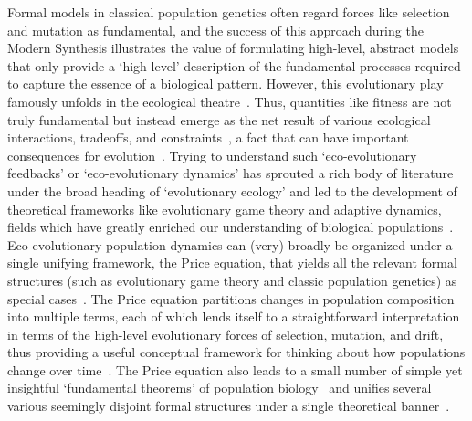 Formal models in classical population genetics often regard forces like selection and mutation as fundamental, and the success of this approach during the Modern Synthesis illustrates the value of formulating high-level, abstract models that only provide a `high-level' description of the fundamental processes required to capture the essence of a biological pattern. However, this evolutionary play famously unfolds in the ecological theatre~\citep{hutchinson_ecological_1965}. Thus, quantities like fitness are not truly fundamental but instead emerge as the net result of various ecological interactions, tradeoffs, and constraints~\citep{metz_how_1992}, a fact that can have important consequences for evolution~\citep{coulson_putting_2006, kokko_can_2017}. Trying to understand such `eco-evolutionary feedbacks' or `eco-evolutionary dynamics' has sprouted a rich body of literature under the broad heading of `evolutionary ecology' and led to the development of theoretical frameworks like evolutionary game theory and adaptive dynamics, fields which have greatly enriched our understanding of biological populations~\citep{brown_why_2016,lion_theoretical_2018,govaert_eco-evolutionary_2019,svensson_eco-evolutionary_2019}. Eco-evolutionary population dynamics can (very) broadly be organized under a single unifying framework, the Price equation, that yields all the relevant formal structures (such as evolutionary game theory and classic population genetics) as special cases~\citep{page_unifying_2002, queller_fundamental_2017, lion_theoretical_2018}. The Price equation partitions changes in population composition into multiple terms, each of which lends itself to a straightforward interpretation in terms of the high-level evolutionary forces of selection, mutation, and drift, thus providing a useful conceptual framework for thinking about how populations change over time~\citep{frank_natural_2012}. The Price equation also leads to a small number of simple yet insightful `fundamental theorems' of population biology~\citep{queller_fundamental_2017, lion_theoretical_2018, lehtonen_price_2018} and unifies several various seemingly disjoint formal structures under a single theoretical banner~\citep{ lehtonen_price_2020, luque_mirror_2021}.

